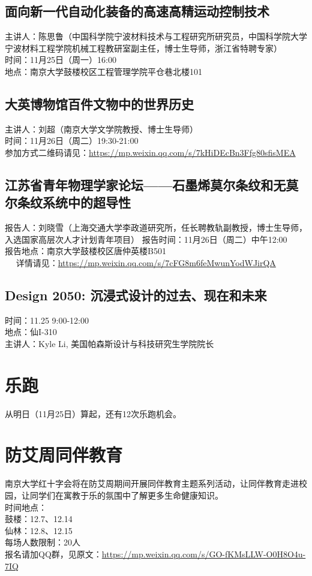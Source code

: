 \documentclass[letterpaper, 12pt]{article}
\begin{document}
\begin{multicols}{2}
\subsection{面向新一代自动化装备的高速高精运动控制技术}
主讲人：陈思鲁（中国科学院宁波材料技术与工程研究所研究员，中国科学院大学宁波材料工程学院机械工程教研室副主任，博士生导师，浙江省特聘专家）\\
时间：11月25日（周一）16:00\\
地点：南京大学鼓楼校区工程管理学院平仓巷北楼101\\

\subsection{大英博物馆百件文物中的世界历史}
主讲人：刘超（南京大学文学院教授、博士生导师）\\
时间：11月26日（周二）19:30-21:00\\
参加方式二维码请见：\url{https://mp.weixin.qq.com/s/7kHiDEcBn3Ffg80sfisMEA}\\

\subsection{江苏省青年物理学家论坛——石墨烯莫尔条纹和无莫尔条纹系统中的超导性}
报告人：刘晓雪（上海交通大学李政道研究所，任长聘教轨副教授，博士生导师，入选国家高层次人才计划青年项目）
报告时间：11月26日（周二）中午12:00\\
报告地点：南京大学鼓楼校区唐仲英楼B501\\  
详情请见：\url{https://mp.weixin.qq.com/s/7cFG8m6feMwunYodWJirQA}\\
\subsection{Design 2050: 沉浸式设计的过去、现在和未来}
时间：11.25 9:00-12:00\\
地点：仙I-310\\
主讲人：Kyle Li, 美国帕森斯设计与科技研究生学院院长
\section{乐跑}
从明日（11月25日）算起，还有12次乐跑机会。
\section{防艾周同伴教育}
南京大学红十字会将在防艾周期间开展同伴教育主题系列活动，让同伴教育走进校园，让同学们在寓教于乐的氛围中了解更多生命健康知识。\\
时间地点：\\
鼓楼：12.7、12.14\\
仙林：12.8、12.15\\
每场人数限制：20人\\
报名请加QQ群，见原文：\url{https://mp.weixin.qq.com/s/GO-fKMsLLW-O0H8O4u-7IQ}



\end{multicols}
\end{document}

